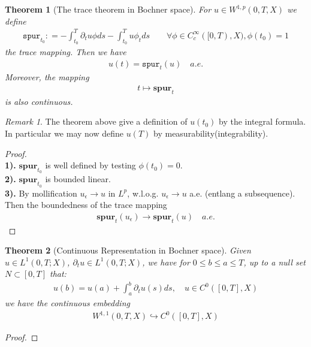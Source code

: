 \documentclass[a4paper,11pt,oneside,fleqn]{book}
\newtheorem{theorem}{Theorem}[section]
\theoremstyle{definition}
\theoremstyle{remark}
\newtheorem*{remark}{Remark}
\begin{document}
\begin{theorem}[The trace theorem in Bochner space]
	For $u \in W^{1, p}(0, T, X)$ we define
	\begin{align*}
		\texttt{spur}_{t_0}: = - \int_{t_0}^T \partial_t u \phi ds - \int_{t_0}^T u \phi_t ds \qquad \forall \phi \in C^\infty_c([0, T), X), \phi(t_0) = 1
	\end{align*}
	the trace mapping. Then we have
	\begin{align*}
		u(t) = \texttt{spur}_t(u) \quad a.e.
	\end{align*}
	Moreover, the mapping 
	\begin{align*}
		t \mapsto \textbf{spur}_t
	\end{align*}
	is also continuous.
\end{theorem}
\begin{remark}
The theorem above give a definition of $u(t_0)$ by the integral formula. In particular we may now define $u(T)$ by measurability(integrability). 	
\end{remark}
\begin{proof}
	\quad\\
	\textbf{1). } $\textbf{spur}_{t_0}$ is well defined by testing $\phi(t_0) = 0$.\\
	\textbf{2). } $\textbf{spur}_{t_0}$ is bounded linear.\\
	\textbf{3). } By mollification $u_\epsilon \rightarrow u$ in $L^p$, w.l.o.g. $u_\epsilon \rightarrow u$ a.e. (entlang a subsequence). Then the boundedness of the trace mapping 
	\begin{align*}
		\textbf{spur}_t(u_\epsilon) \rightarrow \textbf{spur}_t(u) \quad a.e.
	\end{align*}
\end{proof}

\begin{theorem}[Continuous Representation in Bochner space]
Given $ u \in L^1(0, T; X)$, $\partial_t u \in L^1(0, T; X)$, we have for $0 \le b \le a \le T$, up to a null set $N \subset [0, T]$ that:
\begin{align*}
	u(b) = u(a) + \int_a^b \partial_t u(s) ds , \quad u \in C^0([0, T], X)
\end{align*}
we have the continuous embedding
\begin{align*}
	W^{1, 1}(0, T, X) \hookrightarrow C^0([0, T], X)
\end{align*}
\end{theorem}
\begin{proof}
	
\end{proof}
\end{document}
